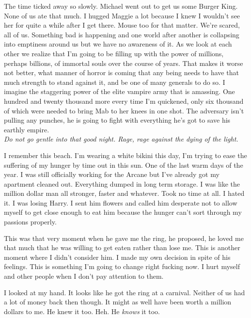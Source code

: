 The time ticked away so slowly. Michael went out to get us some Burger King. None of us ate that much. I hugged Maggie a lot because I knew I wouldn't see her for quite a while after I get there. Mouse too for that matter. We're scared, all of us. Something bad is happening and one world after another is collapsing into emptiness around us but we have no awareness of it. As we look at each other we realize that I'm going to be filling up with the power of millions, perhaps billions, of immortal souls over the course of years. That makes it worse not better, what manner of horror is coming that any being needs to have that much strength to stand against it, and be one of many generals to do so. I imagine the staggering power of the elite vampire army that is amassing. One hundred and twenty thousand more every time I'm quickened, only six thousand of which were needed to bring Mab to her knees in one shot. The adversary isn't pulling any punches, he is going to fight with everything he's got to save his earthly empire. \\

\textit{Do not go gentle into that good night. Rage, rage against the dying of the light.}\\


\parasep

I remember this beach. I'm wearing a white bikini this day, I'm trying to ease the suffering of my hunger by time out in this sun. One of the last warm days of the year. I was still officially working for the Arcane but I've already got my apartment cleaned out. Everything dumped in long term storage. I was like the million dollar man all stronger, faster and whatever. Took no time at all. I hated it. I was losing Harry. I sent him flowers and called him desperate not to allow myself to get close enough to eat him because the hunger can't sort through my passions properly.

This was that very moment when he gave me the ring, he proposed, he loved me that much that he was willing to get eaten rather than lose me. This is another moment where I didn't consider him. I made my own decision in spite of his feelings. This is something I'm going to change right fucking now. I hurt myself and other people when I don't pay attention to them.

I looked at my hand. It looks like he got the ring at a carnival. Neither of us had a lot of money back then though. It might as well have been worth a million dollars to me. He knew it too. Heh. He \textit{knows} it too.

